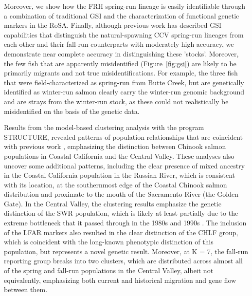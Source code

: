 Moreover, we show how the FRH spring-run lineage is
easily identifiable through a combination of traditional GSI and the characterization
of functional genetic markers in the RoSA. Finally, although previous work has described
GSI capabilities that distinguish the natural-spawning CCV spring-run lineages from
each other and their fall-run counterparts with moderately high accuracy, we demonstrate
near complete accuracy in distinguishing these 'stocks'. Moreover, the few fish that are
apparently misidentified (Figure~\ref{fig:gsi}) are likely to be primarily migrants and not true misidentifications.
For example, the three fish that were field-characterized as spring-run from Butte Creek, but are
genetically identified as winter-run salmon clearly carry the winter-run genomic background and
are strays from the winter-run stock, as these could not realistically be misidentified on the 
basis of the genetic data.

Results from the model-based clustering analysis with the program STRUCTURE, revealed patterns 
of population relationships that are coincident with previous work 
\citep{clemento2014evaluation,kinziger2013contemporary}, emphasizing
the distinction between Chinook salmon populations 
in Coastal California and the Central Valley. These analyses also uncover some additional patterns, 
including the clear presence of mixed ancestry in the Coastal California population in the 
Russian River, which is consistent with its location, at the southernmost edge of the 
Coastal Chinook salmon distribution and proximate to the mouth of the Sacramento River 
(the Golden Gate). In the Central Valley, the clustering results emphasize the genetic 
distinction of the SWR population, which is likely at least partially due to 
the extreme bottleneck that it passed through in the 1980s and 1990s \citep{hedrick1994effective}. The inclusion 
of the LFAR markers also resulted in the clear distinction of the CHLF group, which 
is coincident with the long-known phenotypic distinction of this population, but represents a novel 
genetic result. Moreover, at K = 7, the fall-run reporting group breaks into two clusters, 
which are distributed across almost all of the spring and fall-run populations in the 
Central Valley, albeit not equivalently, emphasizing both current and historical migration and 
gene flow between them. 

